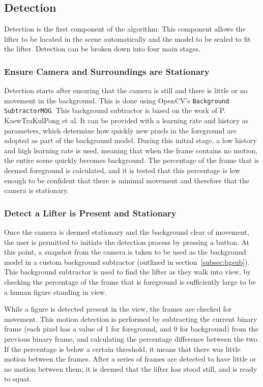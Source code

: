 \subsection{Detection}

Detection is the first component of the algorithm. This component allows the lifter to be located in the scene automatically and the model to be scaled to fit the lifter. Detection can be broken down into four main stages.

\subsubsection{Ensure Camera and Surroundings are Stationary}
Detection starts after ensuring that the camera is still and there is little or no movement in the background. This is done using OpenCV's \texttt{Background SubtractorMOG}. This background subtractor is based on the work of P. KaewTraKulPong et al\cite{backgroundsubmog}. It can be provided with a learning rate and history as parameters, which determine how quickly new pixels in the foreground are adopted as part of the background model. During this initial stage, a low history and high learning rate is used, meaning that when the frame contains no motion, the entire scene quickly becomes background. The percentage of the frame that is deemed foreground is calculated, and it is tested that this percentage is low enough to be confident that there is minimal movement and therefore that the camera is stationary.

\subsubsection{Detect a Lifter is Present and Stationary}
Once the camera is deemed stationary and the background clear of movement, the user is permitted to initiate the detection process by pressing a button. At this point, a snapshot from the camera is taken to be used as the background model in a custom background subtractor (outlined in section~\ref{subsec:bgsub}). This background subtractor is used to find the lifter as they walk into view, by checking the percentage of the frame that is foreground is sufficiently large to be a human figure standing in view. 

While a figure is detected present in the view, the frames are checked for movement. This motion detection is performed by subtracting the current binary frame (each pixel has a value of 1 for foreground, and 0 for background) from the previous binary frame, and calculating the percentage difference between the two. If the percentage is below a certain threshold, it means that there was little motion between the frames. After a series of frames are detected to have little or no motion between them, it is deemed that the lifter has stood still, and is ready to squat.

